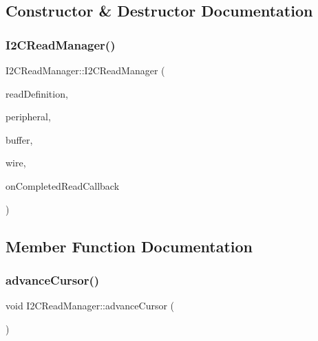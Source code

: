\subsection{Constructor \& Destructor Documentation}
\mbox{\label{class_i2_c_read_manager_a32c36b6f8c14cc7c8d845b2c9e4e3884}} 
\subsubsection{\texorpdfstring{I2\+C\+Read\+Manager()}{I2CReadManager()}}
{\footnotesize\ttfamily I2\+C\+Read\+Manager\+::\+I2\+C\+Read\+Manager (\begin{DoxyParamCaption}\item[{\mbox{\hyperlink{struct_read_definition}{Read\+Definition}} $\ast$}]{read\+Definition,  }\item[{\mbox{\hyperlink{struct_peripheral}{Peripheral}} $\ast$}]{peripheral,  }\item[{uint8\+\_\+t $\ast$}]{buffer,  }\item[{Two\+Wire $\ast$}]{wire,  }\item[{std\+::shared\+\_\+ptr$<$ \mbox{\hyperlink{_scheduler_8h_a2125a5a2949d6ee13163b671159c0d4d}{Func}} $>$}]{on\+Completed\+Read\+Callback }\end{DoxyParamCaption})}



\subsection{Member Function Documentation}
\mbox{\label{class_i2_c_read_manager_a3b901ae787a7e5c94004ed70fea67c49}} 
\subsubsection{\texorpdfstring{advance\+Cursor()}{advanceCursor()}}
{\footnotesize\ttfamily void I2\+C\+Read\+Manager\+::advance\+Cursor (\begin{DoxyParamCaption}{ }\end{DoxyParamCaption})\hspace{0.3cm}{\ttfamily [private]}}

